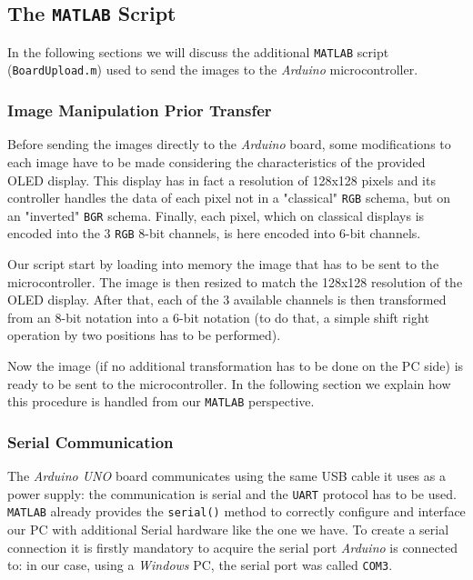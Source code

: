\documentclass[a4paper]{article}
\begin{document}
    \subsection{The \texttt{MATLAB} Script}
        In the following sections we will discuss the additional \texttt{MATLAB} script (\texttt{BoardUpload.m}) used to send the images to the \emph{Arduino} microcontroller.

        \subsubsection{Image Manipulation Prior Transfer}
            Before sending the images directly to the \emph{Arduino} board, some modifications to each image have to be made considering the characteristics of the provided OLED display.
            This display has in fact a resolution of 128x128 pixels and its controller handles the data of each pixel not in a "classical" \texttt{RGB} schema, but on an "inverted" \texttt{BGR} schema. Finally, each pixel, which on classical displays is encoded into the 3 \texttt{RGB} 8-bit channels, is here encoded into 6-bit channels.

            Our script start by loading into memory the image that has to be sent to the microcontroller. The image is then resized to match the 128x128 resolution of the OLED display. After that, each of the 3 available channels is then transformed from an 8-bit notation into a 6-bit notation (to do that, a simple shift right operation by two positions has to be performed).

            Now the image (if no additional transformation has to be done on the PC side) is ready to be sent to the microcontroller. In the following section we explain how this procedure is handled from our \texttt{MATLAB} perspective.

        \subsubsection{Serial Communication}
            The \emph{Arduino UNO} board communicates using the same USB cable it uses as a power supply: the communication is serial and the \texttt{UART} protocol has to be used.
            \texttt{MATLAB} already provides the \texttt{serial()} method to correctly configure and interface our PC with additional Serial hardware like the one we have.
            To create a serial connection it is firstly mandatory to acquire the serial port \emph{Arduino} is connected to: in our case, using a \emph{Windows} PC, the serial port was called \texttt{COM3}.
\end{document}
